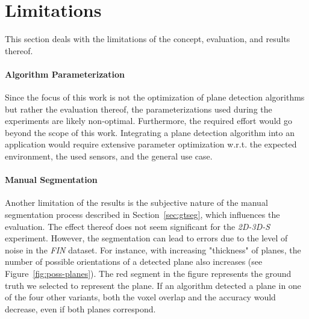 \documentclass[main.tex]{subfiles}
\begin{document}
\section{Limitations}
This section deals with the limitations of the concept, evaluation, and results thereof.
\paragraph{Algorithm Parameterization}
Since the focus of this work is not the optimization of plane detection algorithms but rather the evaluation thereof, the parameterizations used during the experiments are likely non-optimal. Furthermore, the required effort would go beyond the scope of this work. Integrating a plane detection algorithm into an application would require extensive parameter optimization w.r.t. the expected environment, the used sensors, and the general use case.

\paragraph{Manual Segmentation}
Another limitation of the results is the subjective nature of the manual segmentation process described in Section~\ref{sec:gtseg}, which influences the evaluation. The effect thereof does not seem significant for the \textit{2D-3D-S} experiment. However, the segmentation can lead to errors due to the level of noise in the \textit{FIN} dataset. For instance, with increasing "thickness" of planes, the number of possible orientations of a detected plane also increases (see Figure~\ref{fig:poss-planes}). The red segment in the figure represents the ground truth we selected to represent the plane. If an algorithm detected a plane in one of the four other variants, both the voxel overlap and the accuracy would decrease, even if both planes correspond.
\end{document}
